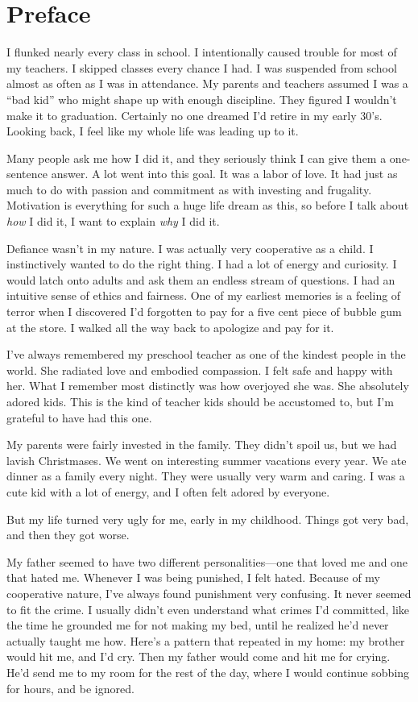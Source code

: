 \chapter{Preface}
I flunked nearly every class in school. I intentionally caused trouble for most of my teachers. I skipped classes every chance I had. I was suspended from school almost as often as I was in attendance. My parents and teachers assumed I was a ``bad kid'' who might shape up with enough discipline. They figured I wouldn't make it to graduation. Certainly no one dreamed I'd retire in my early 30's. Looking back, I feel like my whole life was leading up to it.

Many people ask me how I did it, and they seriously think I can give them a one-sentence answer. A lot went into this goal. It was a labor of love. It had just as much to do with passion and commitment as with investing and frugality. Motivation is everything for such a huge life dream as this, so before I talk about \emph{how} I did it, I want to explain \emph{why} I did it.

Defiance wasn't in my nature. I was actually very cooperative as a child. I instinctively wanted to do the right thing. I had a lot of energy and curiosity. I would latch onto adults and ask them an endless stream of questions. I had an intuitive sense of ethics and fairness. One of my earliest memories is a feeling of terror when I discovered I'd forgotten to pay for a five cent piece of bubble gum at the store. I walked all the way back to apologize and pay for it.

I've always remembered my preschool teacher as one of the kindest people in the world. She radiated love and embodied compassion. I felt safe and happy with her. What I remember most distinctly was how overjoyed she was. She absolutely adored kids. This is the kind of teacher kids should be accustomed to, but I'm grateful to have had this one.

My parents were fairly invested in the family. They didn't spoil us, but we had lavish Christmases. We went on interesting summer vacations every year. We ate dinner as a family every night. They were usually very warm and caring. I was a cute kid with a lot of energy, and I often felt adored by everyone.

But my life turned very ugly for me, early in my childhood. Things got very bad, and then they got worse.

My father seemed to have two different personalities---one that loved me and one that hated me. Whenever I was being punished, I felt hated. Because of my cooperative nature, I've always found punishment very confusing. It never seemed to fit the crime. I usually didn't even understand what crimes I'd committed, like the time he grounded me for not making my bed, until he realized he'd never actually taught me how. Here's a pattern that repeated in my home: my brother would hit me, and I'd cry. Then my father would come and hit me for crying. He'd send me to my room for the rest of the day, where I would continue sobbing for hours, and be ignored.

